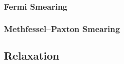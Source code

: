         \subsubsection{Fermi Smearing}
        \subsubsection{Methfessel–Paxton Smearing}

        \subsection{Relaxation}



